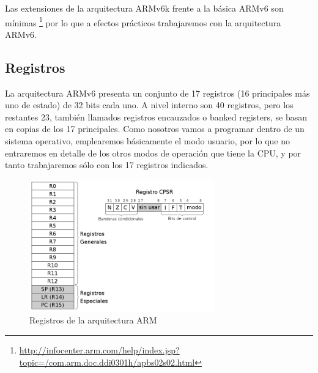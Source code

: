 
Las extensiones de la arquitectura ARMv6k frente a la básica ARMv6 son mínimas
\footnote{\url{http://infocenter.arm.com/help/index.jsp?topic=/com.arm.doc.ddi0301h/apbs02s02.html}}
por lo que a efectos prácticos trabajaremos con la arquitectura ARMv6.

\subsection{Registros}
\label{sec:Registros}

La arquitectura ARMv6 presenta un conjunto de 17 registros (16 principales más uno de estado) de 32 bits cada uno. A nivel interno son 40 registros, pero los restantes 23, también llamados registros encauzados o banked registers, se basan en copias de los 17 principales. Como nosotros vamos a programar dentro de un sistema operativo, emplearemos básicamente el modo usuario, por lo que no entraremos en detalle de los otros modos de operación que tiene la CPU, y por tanto trabajaremos sólo con los 17 registros indicados.

\begin{figure}[h]
  \centering
    \includegraphics[width=8cm]{graphs/registros.png}
  \caption{Registros de la arquitectura ARM}
  \label{fig:reg_arm}
\end{figure}


\chapterend{}
